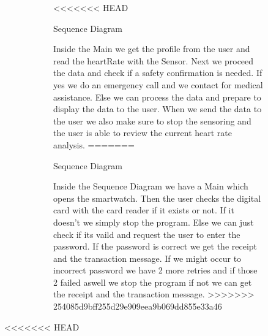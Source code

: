 \documentclass{article}
\begin{document}
	\begin{figure}[htbp]
		\centering
		\begin{subfigure}{\textwidth}
<<<<<<< HEAD
			\resizebox{\textwidth}{!}{}
			\caption{Sequence Diagram}
		\end{subfigure}
		\begin{subfigure}{\textwidth}
			Inside the Main we get the profile from the user and read the heartRate with the Sensor. Next we proceed the data and check 
			if a safety confirmation is needed. If yes we do an emergency call and we contact for medical assistance. Else we can process 
			the data and prepare to display the data to the user. When we send the data to the user we also make sure to stop the sensoring and 
			the user is able to review the current heart rate analysis. 
=======
			\resizebox{\textwidth}{!}{}
			\caption{Sequence Diagram}
		\end{subfigure}
		\begin{subfigure}{\textwidth}
			Inside the Sequence Diagram we have a Main which opens the smartwatch. Then the user checks the digital card with the 
			card reader if it exists or not. If it doesn't we simply stop the program. Else we can just check if its vaild and request the 
			user to enter the password. If the password is correct we get the receipt and the transaction message. If we might occur to incorrect 
			password we have 2 more retries and if those 2 failed aswell we stop the program if not we can get the receipt and the transaction
			message. 
>>>>>>> 254085d9bff255d29e909eea9b069dd855e33a46
		\end{subfigure}
	\end{figure}
	\newpage

<<<<<<< HEAD
\end{document}

